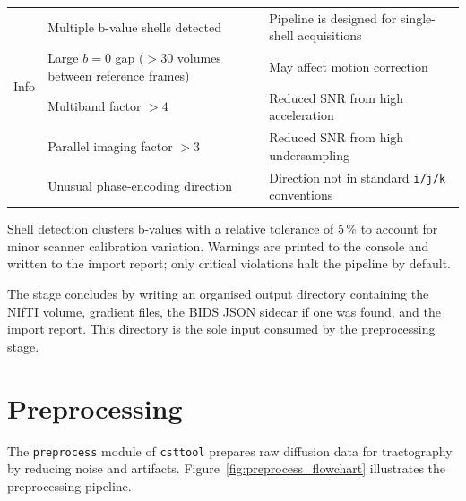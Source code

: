 \begin{table}[htbp]
\begin{tabular}{p{1.8cm} p{5.5cm} p{5.5cm}}
\multirow{4}{*}{Info}
  & Multiple b-value shells detected & Pipeline is designed for single-shell acquisitions \\
  & Large $b = 0$ gap ($> 30$ volumes between reference frames) & May affect motion correction \\
  & Multiband factor $> 4$ & Reduced SNR from high acceleration \\
  & Parallel imaging factor $> 3$ & Reduced SNR from high undersampling \\
  & Unusual phase-encoding direction & Direction not in standard \texttt{i/j/k} conventions \\
\bottomrule
\end{tabular}
\end{table}

Shell detection clusters b-values with a relative tolerance of 5\,\% to account for minor scanner calibration variation. Warnings are printed to the console and written to the import report; only critical violations halt the pipeline by default.

The stage concludes by writing an organised output directory containing the NIfTI volume, gradient files, the BIDS JSON sidecar if one was found, and the import report. This directory is the sole input consumed by the preprocessing stage.

\section{Preprocessing}
\label{sec:methods_preprocessing}

The \texttt{preprocess} module of \texttt{csttool} prepares raw diffusion data for tractography by reducing noise and artifacts. Figure~\ref{fig:preprocess_flowchart} illustrates the preprocessing pipeline.

